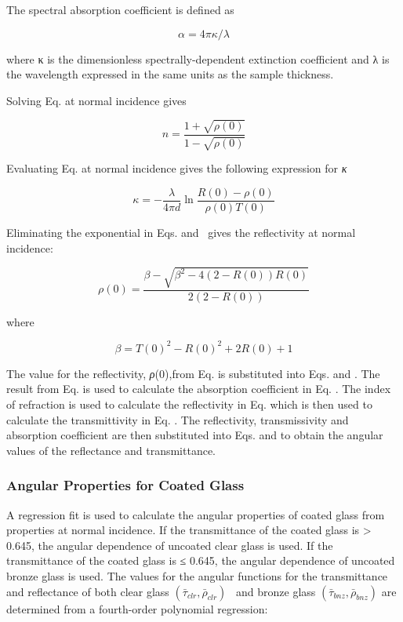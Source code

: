 The spectral absorption coefficient is defined as

\begin{equation}
\alpha  = 4\pi \kappa /\lambda
\end{equation}

where κ is the dimensionless spectrally-dependent extinction coefficient and λ is the wavelength expressed in the same units as the sample thickness.

Solving Eq. at normal incidence gives

\begin{equation}
n = \frac{{1 + \sqrt {\rho (0)} }}{{1 - \sqrt {\rho (0)} }}
\end{equation}

Evaluating Eq. at normal incidence gives the following expression for \emph{κ}

\begin{equation}
\kappa  =  - \frac{\lambda }{{4\pi d}}\ln \frac{{R(0) - \rho (0)}}{{\rho (0)T(0)}}
\end{equation}

Eliminating the exponential in Eqs. and~ gives the reflectivity at normal incidence:

\begin{equation}
\rho (0) = \frac{{\beta  - \sqrt {{\beta ^2} - 4(2 - R(0))R(0)} }}{{2(2 - R(0))}}
\end{equation}

where

\begin{equation}
\beta  = T{(0)^2} - R{(0)^2} + 2R(0) + 1
\end{equation}

The value for the reflectivity, \emph{ρ}(0),from Eq. is substituted into Eqs. and . The result from Eq. is used to calculate the absorption coefficient in Eq. . The index of refraction is used to calculate the reflectivity in Eq. which is then used to calculate the transmittivity in Eq. . The reflectivity, transmissivity and absorption coefficient are then substituted into Eqs. and to obtain the angular values of the reflectance and transmittance.

\subsubsection{Angular Properties for Coated Glass}\label{angular-properties-for-coated-glass}

A regression fit is used to calculate the angular properties of coated glass from properties at normal incidence. If the transmittance of the coated glass is \textgreater{} 0.645, the angular dependence of uncoated clear glass is used. If the transmittance of the coated glass is ≤ 0.645, the angular dependence of uncoated bronze glass is used. The values for the angular functions for the transmittance and reflectance of both clear glass \(({\bar \tau_{clr}},{\bar \rho_{clr}})\) ~and bronze glass \(({\bar \tau_{bnz}},{\bar \rho_{bnz}})\) are determined from a fourth-order polynomial regression:

